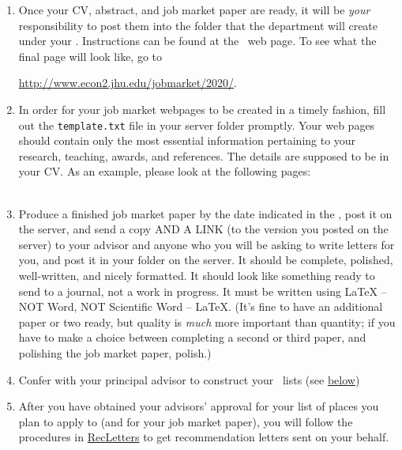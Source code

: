\documentclass{\classes/econtex}
\begin{document}
\begin{enumerate}
  \hypertarget{Post-To-Server}{}
\item Once your CV, abstract, and job market paper are ready, it will
  be \textit{your} responsibility to post them into the folder that
  the department will create under your \Moniker.
  Instructions can be found at the~{\JMPHLink} web page.  To see what
  the final page will look like, go to
  
  \url{http://www.econ2.jhu.edu/jobmarket/2020/}.
  
  \hypertarget{Template}{}
\item In order for your job market webpages to be created in a timely fashion, 
  fill out the \texttt{template.txt} file in your server folder promptly.
  Your web pages should contain only the most essential information 
  pertaining to your research, teaching, awards, and references. 
  The details are supposed to be in your CV.
  As an example, please look at the following pages:\\
  \\
  

  \hypertarget{Produce-Job-Paper}{}
\item Produce a finished job market paper by the date indicated in the \timet, post it on the server, and send a copy AND A LINK (to the version you posted on the server) to your advisor and anyone who you will be asking to write letters for you, and post it in your folder on the server.  It should be complete, polished, well-written, and nicely formatted.  It should look like something ready to send to a journal, not a work in progress.  It must be written using {\LaTeX} -- NOT Word, NOT Scientific Word -- {\LaTeX}.  (It's fine to have an additional paper or two ready, but quality is \textit{much} more important than quantity; if you have to make a choice between completing a second or third paper, and polishing the job market paper, polish.)
  
  \hypertarget{\EM}{}
\item Confer with your principal advisor to construct your~{\EMtt} lists (see \hyperlink{below}{below})
  
  \hypertarget{Rec-Letters}{}
\item After you have obtained your advisors' approval for your list of
  places you plan to apply to (and for your job market paper), you
  will follow the procedures in \href{\pageurl/RecLetters}{RecLetters} 
  to get recommendation letters sent on your behalf.


\end{enumerate}
\end{document}
